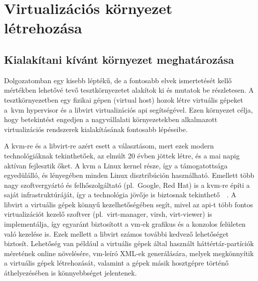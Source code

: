
\chapter{Virtualizációs környezet létrehozása}
\label{chap:testenv}

\section{Kialakítani kívánt környezet meghatározása}
Dolgozatomban egy kisebb léptékű, de a fontosabb elvek ismertetését kellő mértékben lehetővé tevő tesztkörnyezetet alakítok ki és mutatok be részletesen. A tesztkörnyezetben egy fizikai gépen (virtual host) hozok létre virtuális gépeket a~\acrshort{kvm} \gls{hypervisor} és a \gls{libvirt} virtualizációs \acrshort{api} segítségével. Ezen környezet célja, hogy betekintést engedjen a nagyvállalati környezetekben alkalmazott virtualizációs rendszerek kialakításának fontosabb lépéseibe.

A \acrshort{kvm}-re és a \gls{libvirt}-re azért esett a választásom, mert ezek modern technológiáknak tekinthetőek, az elmúlt 20 évben jöttek létre, és a mai napig aktívan fejlesztik őket. A \acrshort{kvm} a Linux kernel része, így a támogatottsága egyedülálló, és lényegében minden Linux disztribúción használható. Emellett több nagy szoftvergyártó és felhőszolgáltató (pl.~Google, Red Hat) is a \acrshort{kvm}-re építi a saját infrastruktúráját, így a technológia jövője is biztosnak tekinthető~\cite{RedHatVirtKVM}~\cite{GoogleCloudKVM}. A \gls{libvirt} a virtuális gépek könnyű kezelhetőségében segít, mivel az \acrshort{api}-t több fontos virtualizációt kezelő szoftver (pl.~virt-manager, virsh, virt-viewer) is implementálja, így egyaránt biztosított a \acrshort{vm}-ek grafikus és a konzolos felületen való kezelése is.
Ezek mellett a \gls{libvirt} számos további kedvező lehetőséget biztosít. Lehetőség van például a virtuális gépek által használt háttértár-partíciók méretének online növelésére, \acrshort{vm}-leíró XML-ek generálására, melyek megkönnyítik a virtuális gépek létrehozását, valamint a gépek másik hosztgépre történő áthelyezésében is könnyebbséget jelentenek.

